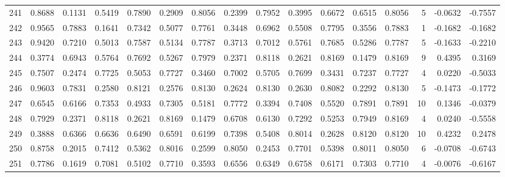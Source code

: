 \begin{tabular}{lrrrrrrrrrrrrrrr}
241 &      0.8688 &  0.1131 &  0.5419 &  0.7890 &  0.2909 &  0.8056 &  0.2399 &  0.7952 &  0.3995 &  0.6672 &   0.6515 &     0.8056 &      5 &                   -0.0632 &                    -0.7557 \\
242 &      0.9565 &  0.7883 &  0.1641 &  0.7342 &  0.5077 &  0.7761 &  0.3448 &  0.6962 &  0.5508 &  0.7795 &   0.3556 &     0.7883 &      1 &                   -0.1682 &                    -0.1682 \\
243 &      0.9420 &  0.7210 &  0.5013 &  0.7587 &  0.5134 &  0.7787 &  0.3713 &  0.7012 &  0.5761 &  0.7685 &   0.5286 &     0.7787 &      5 &                   -0.1633 &                    -0.2210 \\
244 &      0.3774 &  0.6943 &  0.5764 &  0.7692 &  0.5267 &  0.7979 &  0.2371 &  0.8118 &  0.2621 &  0.8169 &   0.1479 &     0.8169 &      9 &                    0.4395 &                     0.3169 \\
245 &      0.7507 &  0.2474 &  0.7725 &  0.5053 &  0.7727 &  0.3460 &  0.7002 &  0.5705 &  0.7699 &  0.3431 &   0.7237 &     0.7727 &      4 &                    0.0220 &                    -0.5033 \\
246 &      0.9603 &  0.7831 &  0.2580 &  0.8121 &  0.2576 &  0.8130 &  0.2624 &  0.8130 &  0.2630 &  0.8082 &   0.2292 &     0.8130 &      5 &                   -0.1473 &                    -0.1772 \\
247 &      0.6545 &  0.6166 &  0.7353 &  0.4933 &  0.7305 &  0.5181 &  0.7772 &  0.3394 &  0.7408 &  0.5520 &   0.7891 &     0.7891 &     10 &                    0.1346 &                    -0.0379 \\
248 &      0.7929 &  0.2371 &  0.8118 &  0.2621 &  0.8169 &  0.1479 &  0.6708 &  0.6130 &  0.7292 &  0.5253 &   0.7949 &     0.8169 &      4 &                    0.0240 &                    -0.5558 \\
249 &      0.3888 &  0.6366 &  0.6636 &  0.6490 &  0.6591 &  0.6199 &  0.7398 &  0.5408 &  0.8014 &  0.2628 &   0.8120 &     0.8120 &     10 &                    0.4232 &                     0.2478 \\
250 &      0.8758 &  0.2015 &  0.7412 &  0.5362 &  0.8016 &  0.2599 &  0.8050 &  0.2453 &  0.7701 &  0.5398 &   0.8011 &     0.8050 &      6 &                   -0.0708 &                    -0.6743 \\
251 &      0.7786 &  0.1619 &  0.7081 &  0.5102 &  0.7710 &  0.3593 &  0.6556 &  0.6349 &  0.6758 &  0.6171 &   0.7303 &     0.7710 &      4 &                   -0.0076 &                    -0.6167 \\

\end{tabular}
